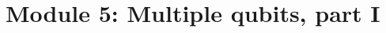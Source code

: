 \begin{comment}

\section{Linear Algebra Review}


\section{Math Review}


\section{Computing Review}


\subsection{Notes 04}


\subsection{Notes n05}


\section{Module 1 Quantum Strangeness}


\section{Module 2 Quantum Linear Algebra, Part I}


\section{Module 3 The Single Qubit}


\section{Module 4: Quantum linear algebra, part II}


\end{comment}

\section{Module 5: Multiple qubits, part I}


